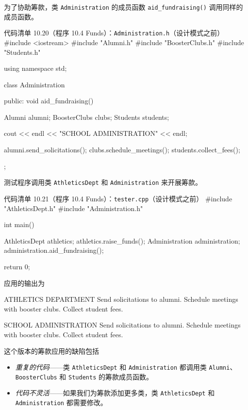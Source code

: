 为了协助筹款，类 \texttt{Administration} 的成员函数 \texttt{aid\_\allowbreak{}fundraising(\allowbreak{})\allowbreak{}} 调用同样的成员函数。

\begin{codeboxt}{代码清单 10.20（程序 10.4 Funds）：\texttt{Administration.\allowbreak{}h}（设计模式之前）}
#include <iostream>
#include "Alumni.h"
#include "BoosterClubs.h"
#include "Students.h"

using namespace std;

class Administration
{
public:
    void aid_fundraising()
    {
        Alumni alumni;
        BoosterClubs clubs;
        Students students;

        cout << endl << "SCHOOL ADMINISTRATION" << endl;

        alumni.send_solicitations();
        clubs.schedule_meetings();
        students.collect_fees();
    }
};
\end{codeboxt}


测试程序调用类 \texttt{Athletics\allowbreak{}Dept} 和 \texttt{Administration} 来开展筹款。

\begin{codeboxt}{代码清单 10.21（程序 10.4 Funds）：\texttt{tester.\allowbreak{}cpp}（设计模式之前）}
#include "AthleticsDept.h"
#include "Administration.h"

int main()
{
    AthleticsDept athletics;
    athletics.raise_funds();
    Administration administration;
    administration.aid_fundraising();

    return 0;
}
\end{codeboxt}

应用的输出为

\begin{codebox}
ATHLETICS DEPARTMENT
Send solicitations to alumni.
Schedule meetings with booster clubs.
Collect student fees.

SCHOOL ADMINISTRATION
Send solicitations to alumni.
Schedule meetings with booster clubs.
Collect student fees.
\end{codebox}

这个版本的筹款应用的缺陷包括

\begin{itemize}
\item \emph{重复的代码}——类 \texttt{Athletics\allowbreak{}Dept} 和 \texttt{Administration} 都调用类 \texttt{Alumni}、\texttt{Booster\allowbreak{}Clubs} 和 \texttt{Students} 的筹款成员函数。
\item \emph{代码不灵活}——如果我们为筹款添加更多类，类 \texttt{Athletics\allowbreak{}Dept} 和 \texttt{Administration} 都需要修改。
\end{itemize}

